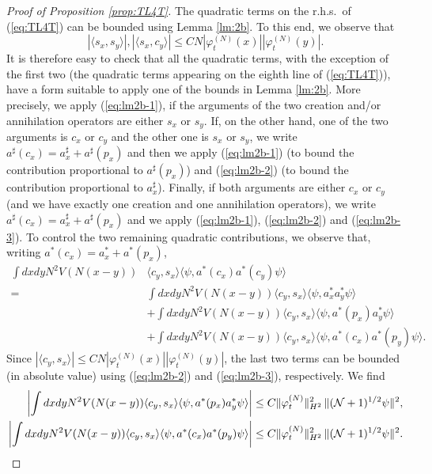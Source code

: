 \documentclass[11pt,a4paper]{article}
\newcommand{\cN}{{\cal N}}
\begin{document}
\begin{proof}[Proof of Proposition \ref{prop:TL4T}]
The quadratic terms on the r.h.s.\ of (\ref{eq:TL4T}) can be bounded using Lemma \ref{lm:2b}. To this end, we observe that
\[ |\langle s_x, s_y \rangle| , |\langle s_x, c_y \rangle| \leq C N |\varphi^{(N)}_t (x)| |\varphi_t^{(N)} (y)|. \]
It is therefore easy to check that all the quadratic terms, with the exception of the first two (the quadratic terms appearing on the eighth line of (\ref{eq:TL4T})), have a form suitable to apply one of the bounds in Lemma \ref{lm:2b}. More precisely, we apply (\ref{eq:lm2b-1}), if the arguments of the two creation and/or annihilation operators are either $s_x$ or $s_y$. If, on the other hand, one of the two arguments is $c_x$ or $c_y$ and the other one is $s_x$ or $s_y$, we write $a^\sharp (c_x) = a^\sharp_x + a^\sharp (p_x)$ and then we apply (\ref{eq:lm2b-1}) (to bound the contribution proportional to $a^\sharp (p_x)$) and (\ref{eq:lm2b-2}) (to bound the contribution proportional to $a_x^\sharp$). Finally, if both arguments are either $c_x$ or $c_y$ (and we have  exactly one creation and one annihilation operators), we write $a^\sharp (c_x) = a^\sharp_x + a^\sharp (p_x)$ and we apply (\ref{eq:lm2b-1}), (\ref{eq:lm2b-2}) and (\ref{eq:lm2b-3}). To control the two remaining quadratic contributions, we observe that,
 writing $a^* (c_x)= a^*_x + a^* (p_x)$,  
\begin{equation} \begin{split}\label{eq:4-2}  \int dx dy N^2 V(N (x-y)) & \langle c_y , s_x \rangle \langle \psi , a^* (c_x) a^* (c_y) \psi \rangle \\ =\; & \int dx dy N^2 V(N (x-y)) \langle c_y , s_x \rangle \langle \psi , a^*_x a^*_y \psi \rangle
\\ &+  \int dx dy N^2 V(N (x-y)) \langle c_y , s_x \rangle \langle \psi , a^* (p_x) a^*_y \psi\rangle
\\ &+  \int dx dy N^2 V(N (x-y)) \langle c_y , s_x \rangle \langle \psi , a^* (c_x) a^*(p_y) \psi \rangle. \end{split} \end{equation}
Since $|\langle c_y , s_x \rangle| \leq C N |\varphi^{(N)}_t (x)| |\varphi^{(N)}_t (y)|$, the last two terms can be bounded (in absolute value) using (\ref{eq:lm2b-2}) and (\ref{eq:lm2b-3}), respectively. We find
\[ \begin{split}
\left|   \int dx dy N^2 V(N (x-y)) \langle c_y , s_x \rangle \langle \psi ,
a^* (p_x) a^*_y \psi\rangle \right| &\leq C \| \varphi_t^{(N)} \|_{H^2}^2 \,
\| (\cN+1)^{1/2} \psi \|^2, \\ 
\left|   \int dx dy N^2 V(N (x-y)) \langle c_y , s_x \rangle \langle \psi , a^* (c_x) a^* (p_y) \psi\rangle \right| &\leq C  \| \varphi_t^{(N)} \|_{H^2}^2 \, \| (\cN+1)^{1/2} \psi \|^2. 

\end{split}\]
\end{proof}
\end{document}
